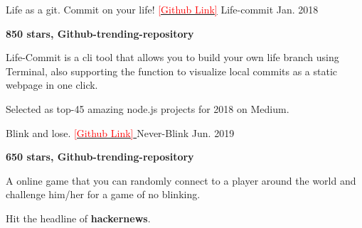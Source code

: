 

\begin{cventries}

  \cventry
    {Life as a git. Commit on your life! \href{https://github.com/ByronHsu/life-commit}{\textcolor{red}{[Github Link]}}} %
    {Life-commit} %
    {} %
    {Jan. 2018} %
    {
      \begin{cvitems} %
        \item {\textbf{850 stars, Github-trending-repository} }
        \item {Life-Commit is a cli tool that allows you to build your own life branch using Terminal, also supporting the function to visualize local commits as a static webpage in one click.}
        \item {Selected as top-45 amazing node.js projects for 2018 on Medium.}
      \end{cvitems}
    }


  \cventry
    {Blink and lose. \href{https://github.com/ByronHsu/Never-Blink}{ \textcolor{red}{[Github Link]} }} %
    {Never-Blink} %
    {} %
    {Jun. 2019} %
    {
      \begin{cvitems} %
        \item {\textbf{650 stars, Github-trending-repository}}
        \item {A online game that you can randomly connect to a player around the world and challenge him/her for a game of no blinking.}
        \item {Hit the headline of \textbf{hackernews}.}
      \end{cvitems}
    }



\end{cventries}
